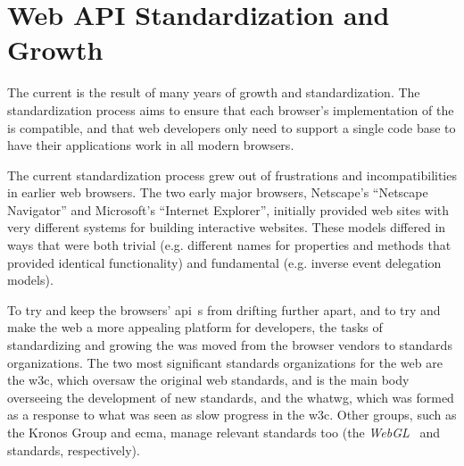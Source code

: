 \section{Web API Standardization and Growth}
\label{background:webapi-growth}

The current \WAPI is the result of many years of growth and standardization.
The standardization process aims to
ensure that each browser's implementation  of the \WAPI is compatible, and that
web developers only need to support a single code base to have their applications
work in all modern browsers.

The current standardization process grew out of frustrations and incompatibilities
in earlier web browsers.  The two early major browsers, Netscape's ``Netscape
Navigator'' and Microsoft's ``Internet Explorer'', initially provided web sites
with very different systems for building interactive websites.  These
models differed in ways that were both trivial
(e.g. different names for properties and methods that provided identical
functionality) and fundamental (e.g. inverse event delegation models).

To try and keep the browsers' \gls{api}~s from drifting further apart, and
to try and make the web a more appealing platform for developers,
the tasks of standardizing and growing the \WAPI was moved from the browser
vendors to standards organizations.  The two most significant standards
organizations for the web are the \gls{w3c}, which oversaw the original web
standards, and is the main body overseeing the development of new \WAPI
standards, and the \gls{whatwg}, which was formed as a response to what was seen
as slow progress in the \gls{w3c}.  Other groups, such as the Kronos Group and
\gls{ecma}, manage relevant standards too (the
\textit{WebGL}~\cite{webgl2015standard} and \textit{\JS}~\cite{ecmascript}
standards, respectively).
